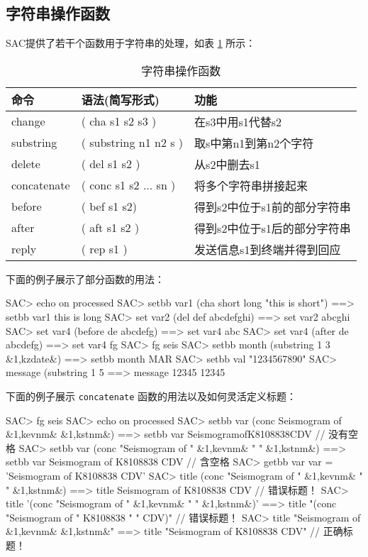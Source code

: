 \subsection{字符串操作函数}
SAC提供了若干个函数用于字符串的处理，如表 \ref{table:string-operation-functions}
所示：
\begin{table}[!ht]
\centering
\ttfamily
\small
\caption{字符串操作函数}
\label{table:string-operation-functions}
\begin{tabular}{lll}
    \toprule
    命令        &   语法(简写形式)          &   功能    \\
    \midrule
    change      &   ( cha s1 s2 s3 )        &   在s3中用s1代替s2    \\
    substring   &   ( substring n1 n2 s )   &   取s中第n1到第n2个字符\\
    delete      &   ( del s1 s2 )           &   从s2中删去s1    \\
    concatenate &   ( conc s1 s2 ... sn )   &   将多个字符串拼接起来 \\
    before      &   ( bef s1 s2)            &   得到s2中位于s1前的部分字符串\\
    after       &   ( aft s1 s2 )           &   得到s2中位于s1后的部分字符串\\
    reply       &   ( rep s1 )              &   发送信息s1到终端并得到回应  \\
    \bottomrule
\end{tabular}
\end{table}

下面的例子展示了部分函数的用法：
\begin{SACCode}
SAC> echo on processed
SAC> setbb var1 (cha short long "this is short")
 ==>  setbb var1 this is long
SAC> set var2 (del def abcdefghi)
 ==>  set var2 abcghi
SAC> set var4 (before de abcdefg)
 ==>  set var4 abc
SAC> set var4 (after de abcdefg)
 ==>  set var4 fg
SAC> fg seis
SAC> setbb month (substring 1 3 &1,kzdate&)
 ==>  setbb month MAR
SAC> setbb val "1234567890"
SAC> message (substring 1 5 %
 ==>  message 12345
 12345
\end{SACCode}

下面的例子展示 \texttt{concatenate} 函数的用法以及如何灵活定义标题：
\begin{SACCode}
SAC> fg seis
SAC> echo on processed
SAC> setbb var (conc Seismogram of &1,kevnm& &1,kstnm&)
 ==>  setbb var SeismogramofK8108838CDV                 // 没有空格
SAC> setbb var (conc "Seismogram of " &1,kevnm& " " &1,kstnm&)
 ==>  setbb var Seismogram of K8108838 CDV              // 含空格
SAC> getbb var
 var = 'Seismogram of K8108838 CDV'
SAC> title (conc "Seismogram of " &1,kevnm& " " &1,kstnm&)
 ==>  title Seismogram of K8108838 CDV                  // 错误标题！
SAC> title '(conc "Seismogram of " &1,kevnm& " " &1,kstnm&)'
 ==>  title "(conc "Seismogram of " K8108838 " " CDV)"  // 错误标题！
SAC> title "Seismogram of &1,kevnm& &1,kstnm&"
 ==>  title "Seismogram of K8108838 CDV"                // 正确标题！
\end{SACCode}

